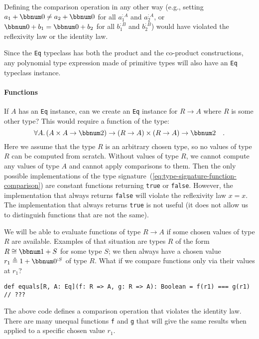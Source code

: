 Defining the comparison operation in any other way (e.g., setting
$a_{1}+\bbnum 0\neq a_{2}+\bbnum 0$ for all $a_{1}^{:A}$ and $a_{2}^{:A}$,
or $\bbnum 0+b_{1}=\bbnum 0+b_{2}$ for all $b_{1}^{:B}$ and $b_{2}^{:B}$)
would have violated the reflexivity law or
the identity law.

Since the \lstinline!Eq! typeclass has both the product and the co-product
constructions, any polynomial type expression made of primitive types
will also have an \lstinline!Eq! typeclass instance.

\paragraph{Functions}

If $A$ has an \lstinline!Eq! instance, can we create an \lstinline!Eq!
instance for $R\rightarrow A$ where $R$ is some other type? This
would require a function of the type:
\begin{equation}
\forall A.\,(A\times A\rightarrow\bbnum 2)\rightarrow\left(R\rightarrow A\right)\times\left(R\rightarrow A\right)\rightarrow\bbnum 2\quad.\label{eq:type-signature-function-comparison}
\end{equation}
Here we assume that the type $R$ is an arbitrary chosen type, so
no values of type $R$ can be computed from scratch. Without values
of type $R$, we cannot compute any values of type $A$ and cannot
apply comparisons to them. Then the only possible implementations
of the type signature~(\ref{eq:type-signature-function-comparison})
are constant functions returning \lstinline!true! or \lstinline!false!.
However, the implementation that always returns \lstinline!false!
will violate the reflexivity law $x=x$. The implementation that always
returns \lstinline!true! is not useful (it does not allow us to distinguish
functions that are not the same).

We will be able to evaluate functions of type $R\rightarrow A$ if
some chosen values of type $R$ are available. Examples of that situation
are types $R$ of the form $R\cong\bbnum 1+S$ for some type $S$;
we then always have a chosen value $r_{1}\triangleq1+\bbnum 0^{:S}$
of type $R$. What if we compare functions only via their values at
$r_{1}$?
\begin{lstlisting}
def equals[R, A: Eq](f: R => A, g: R => A): Boolean = f(r1) === g(r1) // ???
\end{lstlisting}
The above code defines a comparison operation that violates the identity
law. There are many unequal functions \lstinline!f! and \lstinline!g!
that will give the same results when applied to a specific chosen
value $r_{1}$. 

